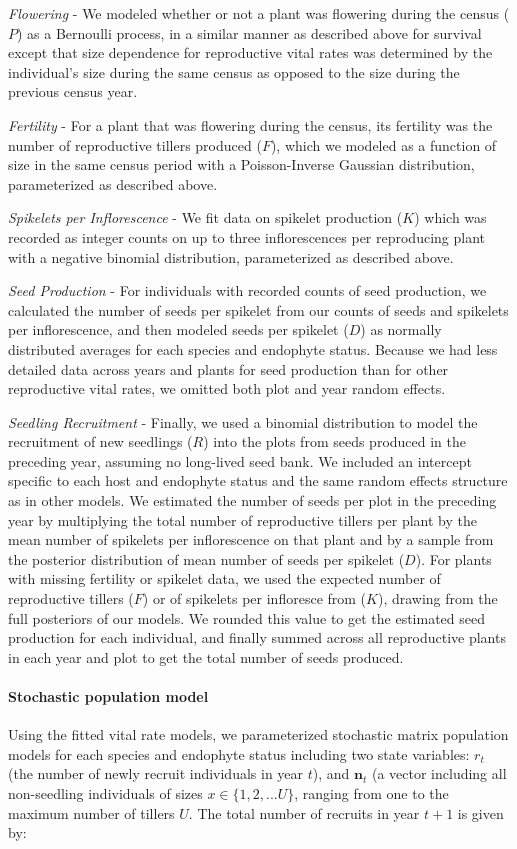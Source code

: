 \documentclass[12pt]{article}
\begin{document}
\emph{Flowering} - We modeled whether or not a plant was flowering during the census ($P$) as a Bernoulli process, in a similar manner as described above for survival except that size dependence for reproductive vital rates was determined by the individual's size during the same census as opposed to the size during the previous census year.

\emph{Fertility} - For a plant that was flowering during the census, its fertility was the number of reproductive tillers produced ($F$), which we modeled as a function of size in the same census period with a Poisson-Inverse Gaussian distribution, parameterized as described above. 

\emph{Spikelets per Inflorescence} - We fit data on spikelet production ($K$) which was recorded as integer counts on up to three inflorescences per reproducing plant with a negative binomial distribution, parameterized as described above. 

\emph{Seed Production} - For individuals with recorded counts of seed production, we calculated the number of seeds per spikelet from our counts of seeds and spikelets per inflorescence, and then modeled seeds per spikelet ($D$) as normally distributed averages for each species and endophyte status. 
Because we had less detailed data across years and plants for seed production than for other reproductive vital rates, we omitted both plot and year random effects. 

\emph{Seedling Recruitment} - Finally, we used a binomial distribution to model the recruitment of new seedlings ($R$) into the plots from seeds produced in the preceding year, assuming no long-lived seed bank. 
We included  an intercept specific to each host and endophyte status and the same random effects structure as in other models. 
We estimated the number of seeds per plot in the preceding year by multiplying the total number of reproductive tillers per plant by the mean number of spikelets per inflorescence on that plant and by a sample from the posterior distribution of mean number of seeds per spikelet ($D$).
For plants with missing fertility or spikelet data, we used the expected number of reproductive tillers ($F$) or of spikelets per infloresce from ($K$), drawing from the full posteriors of our models. 
We rounded this value to get the estimated seed production for each individual, and finally summed across all reproductive plants in each year and plot to get the total number of seeds produced. 

\paragraph*{Stochastic population model}
Using the fitted vital rate models, we parameterized stochastic matrix population models for each species and endophyte status including two state variables: $r_{t}$ (the number of newly recruit individuals in year $t$), and $\textbf{n}_{t}$ (a vector including all non-seedling individuals of sizes $x\in\{1,2,...U\} $, ranging from one to the maximum number of tillers $U$. 
The total number of recruits in year $t+1$ is given by:
\end{document}
